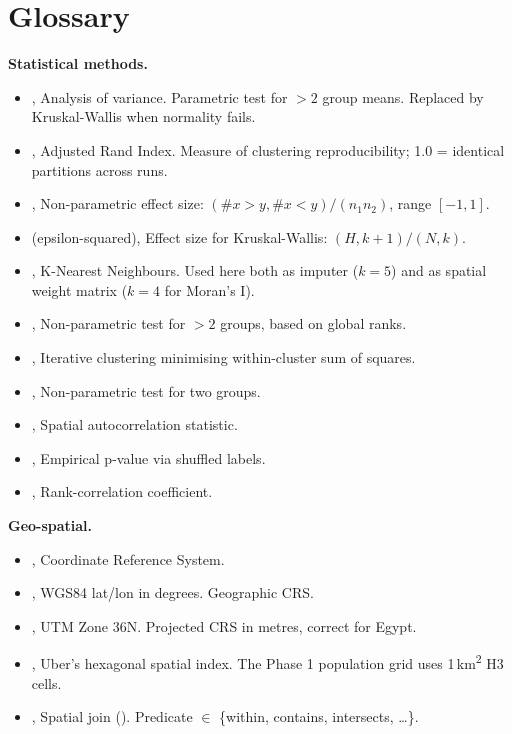 \section{Glossary}
\label{sec:glossary}

\textbf{Statistical methods.}

\begin{itemize}
 \item {}, Analysis of variance. Parametric test for $> 2$
 group means. Replaced by Kruskal-Wallis when normality fails.
 \item {}, Adjusted Rand Index. Measure of clustering
 reproducibility; 1.0 = identical partitions across runs.
 \item {}, Non-parametric effect size:
 $(\#x>y, \#x<y) / (n_1 n_2)$, range $[-1, 1]$.
 \item {} (epsilon-squared), Effect size for
 Kruskal-Wallis: $(H, k + 1)/(N, k)$.
 \item {}, K-Nearest Neighbours. Used here both as imputer
 ($k=5$) and as spatial weight matrix ($k=4$ for Moran's I).
 \item {}, Non-parametric test for $> 2$ groups,
 based on global ranks.
 \item {}, Iterative clustering minimising within-cluster
 sum of squares.
 \item {}, Non-parametric test for two groups.
 \item {}, Spatial autocorrelation statistic.
 \item {}, Empirical p-value via shuffled labels.
 \item {}, Rank-correlation coefficient.
\end{itemize}

\textbf{Geo-spatial.}

\begin{itemize}
 \item {}, Coordinate Reference System.
 \item {}, WGS84 lat/lon in degrees. Geographic CRS.
 \item {}, UTM Zone 36N. Projected CRS in metres,
 correct for Egypt.
 \item {}, Uber's hexagonal spatial index. The Phase 1
 population grid uses 1\,km\textsuperscript{2} H3 cells.
 \item {}, Spatial join (). Predicate
 $\in$ \{within, contains, intersects, \ldots\}.
\end{itemize}

